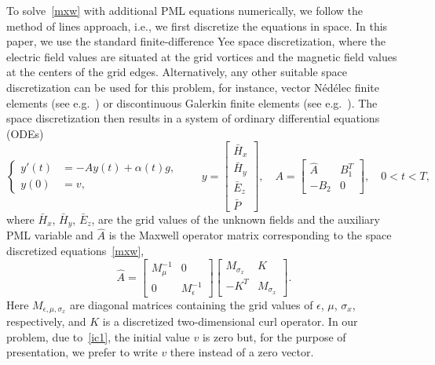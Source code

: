 \documentclass[11pt]{elsarticle}
\newcommand{\Ahat}{\widehat{A}}
\begin{document}
To solve~\eqref{mxw} with additional PML equations numerically, 
we  follow the method of lines approach, i.e., we first discretize
the equations in space.  In this paper, we use the standard 
finite-difference Yee space discretization, where the 
electric field values are situated at the grid vortices and 
the magnetic field values at the centers of the grid edges.
Alternatively, any other suitable space discretization can
be used for this problem, for instance, vector N\'ed\'elec finite 
elements (see e.g.~\cite{BotchevVerwer09})
or discontinuous Galerkin finite elements (see e.g.~\cite{Sarmany_ea2013}).
The space discretization then results in a system of ordinary
differential equations (ODEs)
\begin{equation}
\label{ode}
\left\{\begin{aligned}
y'(t) &= -A y(t) + \alpha(t) g,
\\
y(0)  &= v,
\end{aligned}\right.
\qquad
y = 
\begin{bmatrix}
\bar{H}_x \\ \bar{H}_y \\ \bar{E}_z \\ \bar{P}  
\end{bmatrix},
\quad
A = 
\begin{bmatrix}
\Ahat & B_1^T \\
-B_2    &  0  
\end{bmatrix},
\quad 0<t<T,
\end{equation}
where $\bar{H}_x$, $\bar{H}_y$, $\bar{E}_z$, 
are the grid values of the unknown fields and the auxiliary
PML variable and 
$\Ahat$ is the Maxwell operator matrix corresponding
to the space discretized equations~\eqref{mxw}, 
$$
\Ahat = \begin{bmatrix}
M_\mu^{-1}  & 0 \\
0         & M_\epsilon^{-1}
\end{bmatrix}
\begin{bmatrix}
M_{\sigma_x}  &  K \\
- K^T       &  M_{\sigma_x}
\end{bmatrix}.
$$
Here $M_{\epsilon,\mu,\sigma_{x}}$ are diagonal matrices containing
the grid values of $\epsilon$, $\mu$, $\sigma_{x}$, respectively,
and $K$ is a discretized two-dimensional curl operator.
In our problem, due to~\eqref{ic1}, the initial value $v$ is zero
but, for the purpose of presentation, we prefer to write $v$ there instead 
of a zero vector.
\end{document}
